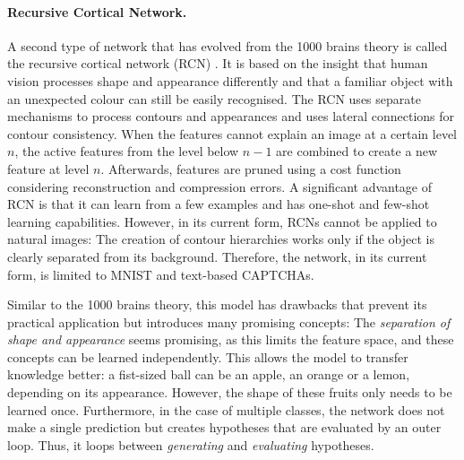 \paragraph{Recursive Cortical Network.} A second type of network that has evolved from the 1000 brains theory is called the recursive cortical network (RCN) . It is based on the insight that human vision processes shape and appearance differently and that a familiar object with an unexpected colour can still be easily recognised.
The RCN uses separate mechanisms to process contours and appearances and uses lateral connections for contour consistency.
When the features cannot explain an image at a certain level $n$, the active features from the level below $n-1$ are combined to create a new feature at level $n$. Afterwards, features are pruned using a cost function considering reconstruction and compression errors.
A significant advantage of RCN is that it can learn from a few examples and has one-shot and few-shot learning capabilities.
However, in its current form, RCNs cannot be applied to natural images: The creation of contour hierarchies works only if the object is clearly separated from its background. Therefore, the network, in its current form, is limited to MNIST  and text-based CAPTCHAs.

Similar to the 1000 brains theory, this model has drawbacks that prevent its practical application but introduces many promising concepts: The \emph{separation of shape and appearance} seems promising, as this limits the feature space, and these concepts can be learned independently. This allows the model to transfer knowledge better: a fist-sized ball can be an apple, an orange or a lemon, depending on its appearance. However, the shape of these fruits only needs to be learned once. Furthermore, in the case of multiple classes, the network does not make a single prediction but creates hypotheses that are evaluated by an outer loop. Thus, it loops between \emph{generating} and \emph{evaluating} hypotheses.


